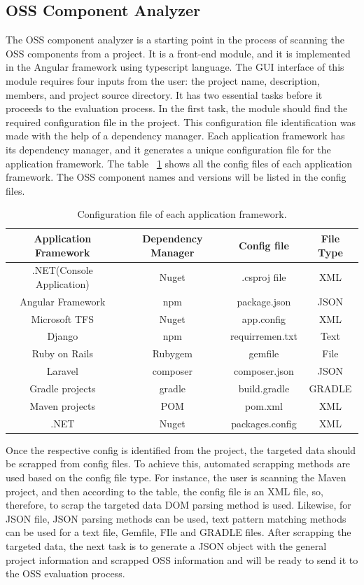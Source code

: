 \subsection{OSS Component Analyzer}
The \acs{OSS} component analyzer is a starting point in the process of scanning the \acs{OSS} components from a project. It is a front-end module, and it is implemented in the Angular framework using typescript language. The GUI interface of this module requires four inputs from the user: the project name, description, members, and project source directory. It has two essential tasks before it proceeds to the evaluation process. In the first task, the module should find the required configuration file in the project. This configuration file identification was made with the help of a dependency manager. Each application framework has its dependency manager, and it generates a unique configuration file for the application framework. The table ~\ref{tab:configFiles} shows all the config files of each application framework. The \acs{OSS} component names and versions will be listed in the config files.
\begin{table}[h!]
\begin{center}
 \begin{tabular}{ |c|c|c|c| } 
 	\hline
 	Application Framework & Dependency Manager & Config file & File Type \\
 	\hline
 	.NET(Console Application) & Nuget & .csproj file & XML \\ 
 	Angular Framework & npm & package.json & JSON \\ 
 	Microsoft TFS & Nuget & app.config & XML \\ 
 	Django & npm & requirremen.txt & Text\\ 
 	Ruby on Rails & Rubygem & gemfile & File \\ 
 	Laravel & composer & composer.json & JSON \\ 
 	Gradle projects & gradle & build.gradle & GRADLE \\ 
 	Maven projects & POM & pom.xml & XML \\ 
 	.NET & Nuget & packages.config & XML \\ 
 	\hline
 \end{tabular}
\caption{Configuration file of each application framework.}\label{tab:configFiles}
\end{center} 
\end{table}

Once the respective config is identified from the project, the targeted data should be scrapped from config files. To achieve this, automated scrapping methods are used based on the config file type. For instance, the user is scanning the Maven project, and then according to the table, the config file is an XML file, so, therefore, to scrap the targeted data \acs{DOM} parsing method is used. Likewise, for \acs{JSON} file, JSON parsing methods can be used, text pattern matching methods can be used for a text file, Gemfile, FIle and GRADLE files. After scrapping the targeted data, the next task is to generate a JSON object with the general project information and scrapped \ac{OSS} information and will be ready to send it to the \acs{OSS} evaluation process. 


